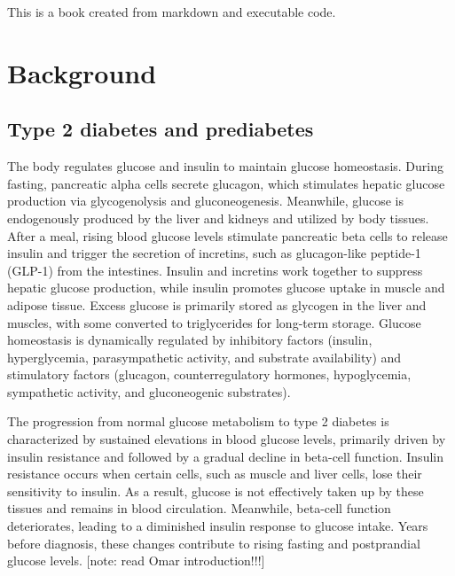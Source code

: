 \documentclass[
  a4paper,
  headsepline=true,
  open=any]{scrbook}
\begin{document}
This is a book created from markdown and executable code.


\hypertarget{background}{%
\chapter{Background}\label{background}}

\hypertarget{type-2-diabetes-and-prediabetes}{%
\section{Type 2 diabetes and
prediabetes}\label{type-2-diabetes-and-prediabetes}}

The body regulates glucose and insulin to maintain glucose homeostasis.
During fasting, pancreatic alpha cells secrete glucagon, which
stimulates hepatic glucose production via glycogenolysis and
gluconeogenesis. Meanwhile, glucose is endogenously produced by the
liver and kidneys and utilized by body tissues. After a meal, rising
blood glucose levels stimulate pancreatic beta cells to release insulin
and trigger the secretion of incretins, such as glucagon-like peptide-1
(GLP-1) from the intestines. Insulin and incretins work together to
suppress hepatic glucose production, while insulin promotes glucose
uptake in muscle and adipose tissue. Excess glucose is primarily stored
as glycogen in the liver and muscles, with some converted to
triglycerides for long-term storage. Glucose homeostasis is dynamically
regulated by inhibitory factors (insulin, hyperglycemia, parasympathetic
activity, and substrate availability) and stimulatory factors (glucagon,
counterregulatory hormones, hypoglycemia, sympathetic activity, and
gluconeogenic substrates).

The progression from normal glucose metabolism to type 2 diabetes is
characterized by sustained elevations in blood glucose levels, primarily
driven by insulin resistance and followed by a gradual decline in
beta-cell function. Insulin resistance occurs when certain cells, such
as muscle and liver cells, lose their sensitivity to insulin. As a
result, glucose is not effectively taken up by these tissues and remains
in blood circulation. Meanwhile, beta-cell function deteriorates,
leading to a diminished insulin response to glucose intake. Years before
diagnosis, these changes contribute to rising fasting and postprandial
glucose levels. {[}note: read Omar introduction!!!{]}
\end{document}
